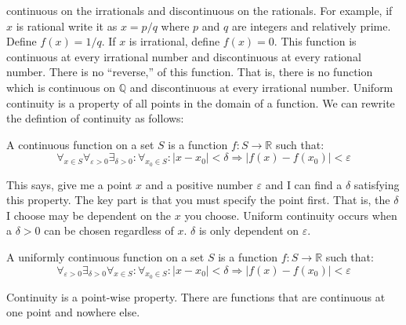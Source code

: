\documentclass[crop=false,class=book,oneside]{standalone}
\begin{document}
            continuous on the irrationals and discontinuous
            on the rationals. For example, if $x$ is
            rational write it as $x=p/q$ where $p$ and
            $q$ are integers and relatively prime. Define
            $f(x)=1/q$. If $x$ is irrational, define
            $f(x)=0$. This function is continuous at every
            irrational number and discontinuous at every
            rational number. There is no ``reverse,'' of this
            function. That is, there is no function which is
            continuous on $\mathbb{Q}$ and discontinuous at
            every irrational number. Uniform continuity is a
            property of all points in the domain of a function.
            We can rewrite the defintion of continuity as
            follows:
            \begin{definition}
                A continuous function on a set $S$ is a
                function $f:S\rightarrow\mathbb{R}$ such that:
                \begin{equation*}
                    \forall_{x\in{S}}\forall_{\varepsilon>0}
                    \exists_{\delta>0}:\forall_{x_{0}\in{S}}:
                    |x-x_{0}|<\delta
                    \Rightarrow|f(x)-f(x_{0})|<\varepsilon
                \end{equation*}
            \end{definition}
            This says, give me a point $x$
            and a positive number
            $\varepsilon$ and I can find a $\delta$ satisfying
            this property. The key part is that you must
            specify the point first. That is, the $\delta$ I
            choose may be dependent on the $x$ you choose.
            Uniform continuity occurs when a $\delta>0$ can be
            chosen regardless of $x$. $\delta$ is
            only dependent on $\varepsilon$.
            \begin{definition}
                A uniformly continuous function on a set $S$
                is a function $f:S\rightarrow\mathbb{R}$ such that:
                \begin{equation*}
                    \forall_{\varepsilon>0}\exists_{\delta>0}
                    \forall_{x\in{S}}:\forall_{x_{0}\in{S}}:
                    |x-x_{0}|<\delta
                    \Rightarrow|f(x)-f(x_{0})|<\varepsilon    
                \end{equation*}
            \end{definition}
            Continuity is a point-wise property. There are functions
            that are continuous at one point and nowhere else.
\end{document}
